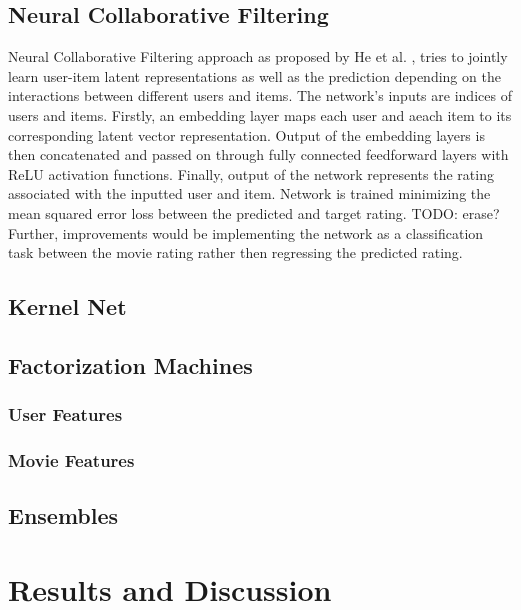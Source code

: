 \documentclass[10pt,conference,compsocconf]{IEEEtran}
\begin{document}
    \subsection{Neural Collaborative Filtering}
    Neural Collaborative Filtering approach as proposed by He et al. \cite{DBLP:journals/corr/abs-1708-05031}, tries to jointly learn user-item latent representations as well as the prediction depending on the interactions between different users and items. The network's inputs are indices of users and items. Firstly, an embedding layer maps each user and aeach item to its corresponding latent vector representation. Output of the embedding layers is then concatenated and passed on through fully connected feedforward layers with ReLU activation functions. Finally, output of the network represents the rating associated with the inputted user and item. Network is trained minimizing the mean squared error loss between the predicted and target rating. TODO: erase? Further, improvements would be implementing the network as a classification task between the movie rating rather then regressing the predicted rating.

    \subsection{Kernel Net}

    \subsection{Factorization Machines}

    \subsubsection{User Features}
    \cite{lee_improving_2017}


    \subsubsection{Movie Features}

    \subsection{Ensembles}


    \section{Results and Discussion}
\end{document}
